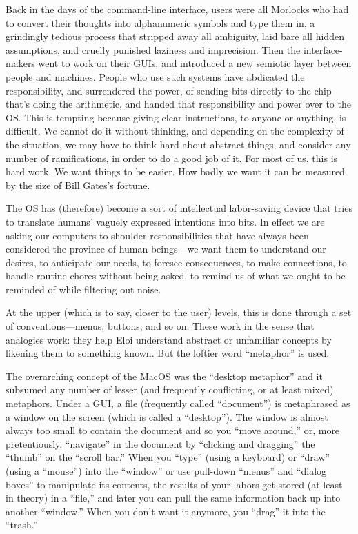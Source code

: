 \documentclass[
  fontsize=11pt,
  paper=landscape,
  twocolumn=true,
  pagesize=pdftex,
  headings=small,
  DIV=15,
  ]{scrartcl}
\begin{document}
Back in the days of the command-line interface, users were all Morlocks
who had to convert their thoughts into alphanumeric symbols and type
them in, a grindingly tedious process that stripped away all ambiguity,
laid bare all hidden assumptions, and cruelly punished laziness and
imprecision. Then the interface-makers went to work on their GUIs, and
introduced a new semiotic layer between people and machines. People who
use such systems have abdicated the responsibility, and surrendered the
power, of sending bits directly to the chip that's doing the arithmetic,
and handed that responsibility and power over to the OS. This is
tempting because giving clear instructions, to anyone or anything, is
difficult. We cannot do it without thinking, and depending on the
complexity of the situation, we may have to think hard about abstract
things, and consider any number of ramifications, in order to do a good
job of it. For most of us, this is hard work. We want things to be
easier. How badly we want it can be measured by the size of Bill Gates's
fortune.

The OS has (therefore) become a sort of intellectual labor-saving device
that tries to translate humans' vaguely expressed intentions into bits.
In effect we are asking our computers to shoulder responsibilities that
have always been considered the province of human beings---we want them
to understand our desires, to anticipate our needs, to foresee
consequences, to make connections, to handle routine chores without
being asked, to remind us of what we ought to be reminded of while
filtering out noise.

At the upper (which is to say, closer to the user) levels, this is done
through a set of conventions---menus, buttons, and so on. These work in
the sense that analogies work: they help Eloi understand abstract or
unfamiliar concepts by likening them to something known. But the loftier
word ``metaphor'' is used.

The overarching concept of the MacOS was the ``desktop metaphor'' and it
subsumed any number of lesser (and frequently conflicting, or at least
mixed) metaphors. Under a GUI, a file (frequently called ``document'')
is metaphrased as a window on the screen (which is called a
``desktop''). The window is almost always too small to contain the
document and so you ``move around,'' or, more pretentiously,
``navigate'' in the document by ``clicking and dragging'' the ``thumb''
on the ``scroll bar.'' When you ``type'' (using a keyboard) or ``draw''
(using a ``mouse'') into the ``window'' or use pull-down ``menus'' and
``dialog boxes'' to manipulate its contents, the results of your labors
get stored (at least in theory) in a ``file,'' and later you can pull
the same information back up into another ``window.'' When you don't
want it anymore, you ``drag'' it into the ``trash.''
\end{document}
